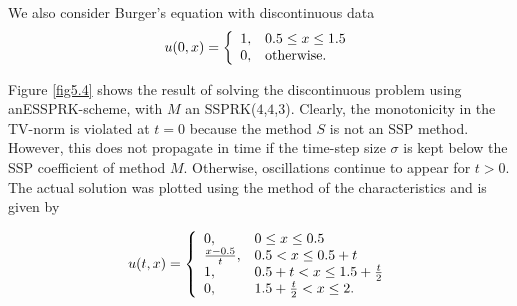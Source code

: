 We also consider Burger's equation with discontinuous data
\begin{equation}\label{eq5.8}
    u(0,x)  = \left\{
                \begin{array}{ll}
                  1, & \hbox{$0.5 \leq x \leq 1.5$} \\
                  0, & \hbox{otherwise.}
                \end{array}
              \right.
\end{equation}

Figure \ref{fig5.4} shows the result of solving the discontinuous problem using anESSPRK-scheme, with $M$ an SSPRK($4$,$4$,$3$). Clearly, the monotonicity in the TV-norm is violated at $t = 0$ because the method $S$ is not an SSP method. However, this does not propagate in time if the time-step size $\sigma$ is kept below the SSP coefficient of method $M$. Otherwise, oscillations continue to appear for $t > 0$. The actual solution was plotted using the method of the characteristics and is given by

\begin{equation}\label{eq5.9}
    u(t,x)  = \left\{
                \begin{array}{ll}
                  0, & \hbox{$0 \leq x \leq 0.5$} \\
                  \frac{x-0.5}{t}, & \hbox{$0.5 < x \leq 0.5 + t$} \\
                  1, & \hbox{$0.5 + t < x \leq 1.5  + \frac{t}{2}$} \\
                  0, & \hbox{$1.5  + \frac{t}{2} < x \leq 2$}. \\
                \end{array}
              \right.
\end{equation}

